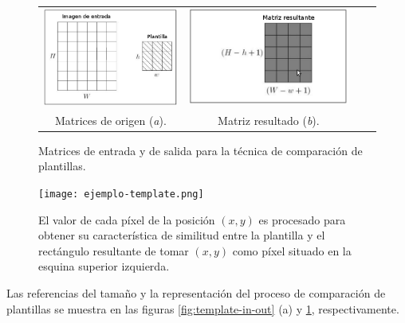 \begin{figure}[H]
  \begin{center}
    \begin{tabular}{cc p{6.6cm}p{8cm}}
      \includegraphics[width=6.6cm]{./imagenes/plantillas.png} &  \includegraphics[width=8cm]{./imagenes/template-resultante.png} \\
                      {Matrices de origen (\emph{a}).} & {Matriz resultado (\emph{b}).} \\
    \end{tabular}
  \end{center}
  \caption{Matrices de entrada y de salida para la técnica de comparación de plantillas.}
\end{figure}
  \label{fig:template-in-out}

\begin{figure}[H]
  \begin{center}
    \texttt{[image: ejemplo-template.png]}
  \end{center}
  \caption{El valor de cada píxel de la posición $(x,y)$ es procesado para obtener su característica de similitud entre la plantilla y el rectángulo resultante de tomar $(x,y)$ como píxel situado en la esquina superior izquierda.}
  \label{fig:template}
\end{figure}

Las referencias del tamaño y la representación del proceso de comparación de plantillas se muestra en las figuras \ref{fig:template-in-out} (a) y \ref{fig:template}, respectivamente.\\

